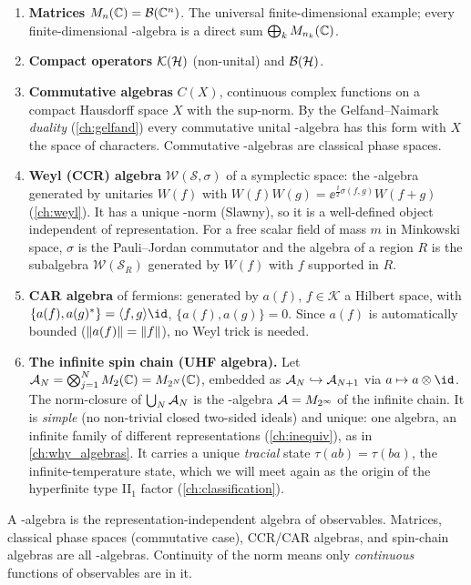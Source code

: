 \begin{enumerate}
\item \textbf{Matrices} $M_n(\mathbb{C})=\mathcal{B}(\mathbb{C}^n)$. The universal finite-dimensional example; every finite-dimensional \cstar-algebra is a direct sum $\bigoplus_kM_{n_k}(\mathbb{C})$.
\item \textbf{Compact operators} $\mathcal K(\mathcal{H})$ (non-unital) and $\mathcal{B}(\mathcal{H})$.
\item \textbf{Commutative algebras} $C(X)$, continuous complex functions on a compact Hausdorff space $X$ with the sup-norm. By the Gelfand--Naimark \emph{duality} (\cref{ch:gelfand}) every commutative unital \cstar-algebra has this form with $X$ the space of characters. Commutative \cstar-algebras are classical phase spaces.
\item \textbf{Weyl (CCR) algebra} $\mathcal W(\mathcal S,\sigma)$ of a symplectic space: the \cstar-algebra generated by unitaries $W(f)$ with $W(f)W(g)=\ee^{\frac\ii2\sigma(f,g)}W(f+g)$ (\cref{ch:weyl}). It has a unique \cstar-norm (Slawny), so it is a well-defined object independent of representation. For a free scalar field of mass $m$ in Minkowski space, $\sigma$ is the Pauli--Jordan commutator and the algebra of a region $R$ is the subalgebra $\mathcal W(\mathcal S_R)$ generated by $W(f)$ with $f$ supported in $R$.
\item \textbf{CAR algebra} of fermions: generated by $a(f)$, $f\in\mathcal K$ a Hilbert space, with $\{a(f),a(g)\ad\}=\inner fg\id$, $\{a(f),a(g)\}=0$. Since $a(f)$ is automatically bounded ($\lVert a(f)\rVert=\lVert f\rVert$), no Weyl trick is needed.
\item \textbf{The infinite spin chain (UHF algebra).} Let $\mathcal{A}_N=\bigotimes_{j=1}^NM_2(\mathbb{C})=M_{2^N}(\mathbb{C})$, embedded as $\mathcal{A}_N\hookrightarrow\mathcal{A}_{N+1}$ via $a\mapsto a\otimes\id$. The norm-closure of $\bigcup_N\mathcal{A}_N$ is the \cstar-algebra $\mathcal{A}=M_{2^\infty}$ of the infinite chain. It is \emph{simple} (no non-trivial closed two-sided ideals) and unique: one algebra, an infinite family of different representations (\cref{ch:inequiv}), as in \cref{ch:why_algebras}. It carries a unique \emph{tracial} state $\tau(ab)=\tau(ba)$, the infinite-temperature state, which we will meet again as the origin of the hyperfinite type II$_1$ factor (\cref{ch:classification}).
\end{enumerate}

\begin{keyidea}
A \cstar-algebra is the representation-independent algebra of observables. Matrices, classical phase spaces (commutative case), CCR/CAR algebras, and spin-chain algebras are all \cstar-algebras. Continuity of the norm means only \emph{continuous} functions of observables are in it.
\end{keyidea}

